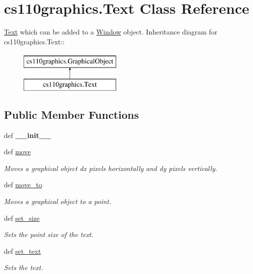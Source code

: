 \hypertarget{classcs110graphics_1_1Text}{
\section{cs110graphics.Text Class Reference}
\label{classcs110graphics_1_1Text}
}


\hyperlink{classcs110graphics_1_1Text}{Text} which can be added to a \hyperlink{classcs110graphics_1_1Window}{Window} object.  
Inheritance diagram for cs110graphics.Text::\begin{figure}[H]
\begin{center}
\leavevmode
\includegraphics[height=2cm]{classcs110graphics_1_1Text}
\end{center}
\end{figure}
\subsection*{Public Member Functions}
\begin{DoxyCompactItemize}
\item 
\hypertarget{classcs110graphics_1_1Text_a022ce78a2945edbd8dfe3c4498769a62}{
def {\bfseries \_\-\_\-init\_\-\_\-}}
\label{classcs110graphics_1_1Text_a022ce78a2945edbd8dfe3c4498769a62}

\item 
def \hyperlink{classcs110graphics_1_1Text_a6bd6f174fc82f2225a4d162ca6b90ec2}{move}
\begin{DoxyCompactList}\small\item\em Moves a graphical object dx pixels horizontally and dy pixels vertically. \item\end{DoxyCompactList}\item 
def \hyperlink{classcs110graphics_1_1Text_a615a76c8d2edd6c6af5d39d4e2577a27}{move\_\-to}
\begin{DoxyCompactList}\small\item\em Moves a graphical object to a point. \item\end{DoxyCompactList}\item 
def \hyperlink{classcs110graphics_1_1Text_ad470aa26235fc2f5f1459c3750251207}{set\_\-size}
\begin{DoxyCompactList}\small\item\em Sets the point size of the text. \item\end{DoxyCompactList}\item 
def \hyperlink{classcs110graphics_1_1Text_ab12aa7478ca6a2b2015b7e8544674c73}{set\_\-text}
\begin{DoxyCompactList}\small\item\em Sets the text. \item\end{DoxyCompactList}\end{DoxyCompactItemize}


